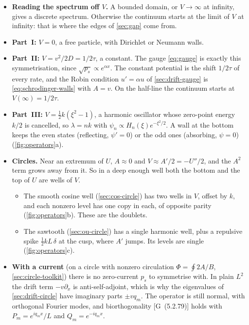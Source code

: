 \documentclass[11pt]{article}
\numberwithin{equation}{section}
\newcommand{\G}[1]{[G~(#1)]}
\begin{document}
\begin{itemize}
  \item \textbf{Reading the spectrum off $V$.} A bounded domain, or $V\to\infty$ at infinity, gives a discrete
        spectrum. Otherwise the continuum starts at the limit of $V$ at infinity: that is where the edges of
        \cref{sec:gap} come from.
  \item \textbf{Part~I:} $V=0$, a free particle, with Dirichlet or Neumann walls.
  \item \textbf{Part~II:} $V=v^2/2D=1/2\tau$, a constant. The gauge \cref{eq:gauge} is exactly this
        symmetrisation, since $\sqrt{p_s}\propto e^{\alpha x}$. The constant potential is the shift $1/2\tau$
        of every rate, and the Robin condition $u'=\alpha u$ of \cref{sec:drift-gauge} is
        \cref{eq:schrodinger-walls} with $A=v$. On the half-line the continuum starts at
        $V(\infty)=1/2\tau$.
  \item \textbf{Part~III:} $V=\tfrac12k(\xi^2-1)$, a harmonic oscillator whose zero-point energy $k/2$ is
        cancelled, so $\lambda=nk$ with $\psi_n\propto H_n(\xi)e^{-\xi^2/2}$. A wall at the bottom keeps the even
        states (reflecting, $\psi'=0$) or the odd ones (absorbing, $\psi=0$) (\cref{fig:operators}a).
  \item \textbf{Circles.} Near an extremum of $U$, $A\approx0$ and $V\approx A'/2=-U''/2$, and the $A^2$ term
        grows away from it. So in a deep enough well both the bottom and the top of $U$ are wells of $V$.
        \begin{itemize}
          \item The smooth cosine well (\cref{sec:cos-circle}) has two wells in $V$, offset by $k$, and each
                nonzero level has one copy in each, of opposite parity (\cref{fig:operators}b). These are the
                doublets.
          \item The sawtooth (\cref{sec:ou-circle}) has a single harmonic well, plus a repulsive spike
                $\tfrac12kL\,\delta$ at the cusp, where $A'$ jumps. Its levels are single
                (\cref{fig:operators}c).
        \end{itemize}
  \item \textbf{With a current} (on a circle with nonzero circulation $\Phi=\oint2A/B$,
        \cref{sec:circle-toolkit}) there is no zero-current $p_s$ to symmetrise with. In
        plain $L^2$ the drift term $-v\partial_x$ is anti-self-adjoint, which is why the eigenvalues of
        \cref{sec:drift-circle} have imaginary parts $\pm vq_m$. The operator is still normal, with orthogonal
        Fourier modes, and biorthogonality \G{5.2.79} holds with $P_m=e^{iq_mx}/L$ and $Q_m=e^{-iq_mx}$.
\end{itemize}
\end{document}
